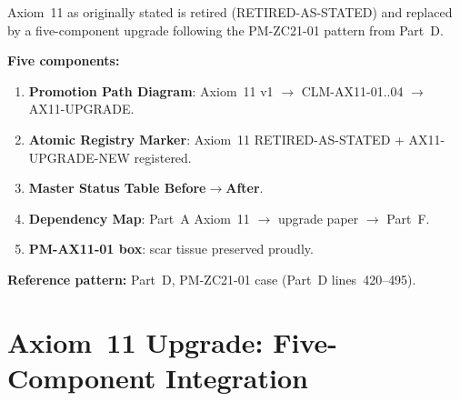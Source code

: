 \documentclass[12pt, a4paper]{article}
\begin{document}
\begin{keybox}[title={Part XXXIII Overview --- PM-ZC21-01 Pattern}]
Axiom~11 as originally stated is retired (RETIRED-AS-STATED)
and replaced by a five-component upgrade following the
PM-ZC21-01 pattern from Part~D.

\textbf{Five components:}
\begin{enumerate}[leftmargin=*, noitemsep, itemsep=2pt]
\item \textbf{Promotion Path Diagram}:
  Axiom~11 v1 $\to$ CLM-AX11-01..04 $\to$ AX11-UPGRADE.
\item \textbf{Atomic Registry Marker}:
  Axiom~11 RETIRED-AS-STATED + AX11-UPGRADE-NEW registered.
\item \textbf{Master Status Table Before$\to$After}.
\item \textbf{Dependency Map}:
  Part~A Axiom~11 $\to$ upgrade paper $\to$ Part~F.
\item \textbf{PM-AX11-01 box}: scar tissue preserved proudly.
\end{enumerate}

\textbf{Reference pattern:} Part~D, PM-ZC21-01 case
(Part~D lines~420--495).
\end{keybox}

\newpage

\section{Axiom~11 Upgrade: Five-Component Integration}
\label{sec:ax11}

\begin{abstract}
Axiom~11 of CRF states that informational patterns achieving
sufficient coherence \emph{may} persist beyond their biological
substrate. This paper replaces the speculative ``may'' with a
structured three-level claim, grounded in the State Architecture
map (Unified Field v3 Section~II.5.C), the Phase-4 Observer
record, and two results from the Bridge Extension paper
(FIND-UF-W02, CLM-UF-$\Phi$01).

No existing Axiom, Theorem, or Confirmed result is altered.
The upgrade is strictly additive: it provides formal conditions
for three levels of post-biological persistence that Axiom~11
previously could only designate as a hypothesis.
\end{abstract}

\tableofcontents
\newpage

\end{document}
